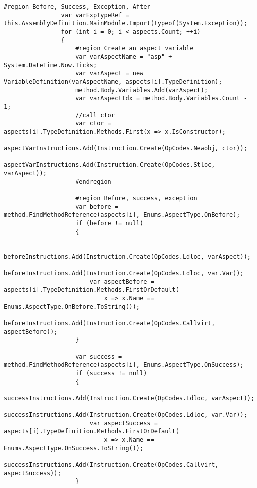 \begin{lstlisting}[caption={../buffalo/Injectors/MethodBoundaryInjector.cs}, label=../buffalo/Injectors/MethodBoundaryInjector.cs, frame=tb, basicstyle=\scriptsize]
                #region Before, Success, Exception, After
                var varExpTypeRef = this.AssemblyDefinition.MainModule.Import(typeof(System.Exception));
                for (int i = 0; i < aspects.Count; ++i)
                {
                    #region Create an aspect variable
                    var varAspectName = "asp" + System.DateTime.Now.Ticks;
                    var varAspect = new VariableDefinition(varAspectName, aspects[i].TypeDefinition);
                    method.Body.Variables.Add(varAspect);
                    var varAspectIdx = method.Body.Variables.Count - 1;
                    //call ctor
                    var ctor = aspects[i].TypeDefinition.Methods.First(x => x.IsConstructor);
                    aspectVarInstructions.Add(Instruction.Create(OpCodes.Newobj, ctor));
                    aspectVarInstructions.Add(Instruction.Create(OpCodes.Stloc, varAspect));
                    #endregion

                    #region Before, success, exception
                    var before = method.FindMethodReference(aspects[i], Enums.AspectType.OnBefore);
                    if (before != null)
                    {

                        beforeInstructions.Add(Instruction.Create(OpCodes.Ldloc, varAspect));
                        beforeInstructions.Add(Instruction.Create(OpCodes.Ldloc, var.Var));
                        var aspectBefore = aspects[i].TypeDefinition.Methods.FirstOrDefault(
                            x => x.Name == Enums.AspectType.OnBefore.ToString());
                        beforeInstructions.Add(Instruction.Create(OpCodes.Callvirt, aspectBefore));
                    }

                    var success = method.FindMethodReference(aspects[i], Enums.AspectType.OnSuccess);
                    if (success != null)
                    {
                        successInstructions.Add(Instruction.Create(OpCodes.Ldloc, varAspect));
                        successInstructions.Add(Instruction.Create(OpCodes.Ldloc, var.Var));
                        var aspectSuccess = aspects[i].TypeDefinition.Methods.FirstOrDefault(
                            x => x.Name == Enums.AspectType.OnSuccess.ToString());
                        successInstructions.Add(Instruction.Create(OpCodes.Callvirt, aspectSuccess));
                    }


\end{lstlisting}

